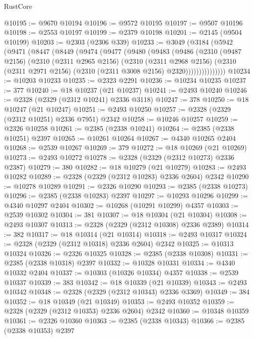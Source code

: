 \begin{lexlean}{RustCore}
\begin{coremodule}
@10195 := @9670 @10194
@10196 := @9572 @10195
@10197 := @9507 @10196
@10198 := @2553 @10197
@10199 := @2379 @10198
@10201 := @2145 (@9504 @10199)
@10203 := @2303 (@2306 @339)
@10233 := @3049
    (@3184
      (@5942
        (@9471
          (@8447
            (@8449
              (@9474
                (@9477
                  (@9480
                    (@9483
                      (@9486
                        (@2310
                          (@9487 @2156)
                          (@2310
                            (@2311 @2965 @2156)
                            (@2310
                              (@2311 @2968 @2156)
                              (@2310
                                (@2311 @2971 @2156)
                                (@2310 (@2311 @3008 @2156) @2320)))))))))))))))
@10234 := @10203 @10233
@10235 := @2323 @2291
@10236 := @10234 @10235
@10237 := 377
@10240 := @18 @10237 (@21 @10237)
@10241 := @2493 @10240
@10246 := @2328 (@2329 (@2312 @10241) @2336 @3118)
@10247 := 378
@10250 := @18 @10247 (@21 @10247)
@10251 := @2493 @10250
@10257 := @2328 (@2329 (@2312 @10251) @2336 @7951) @2342
@10258 := @10246 @10257
@10259 := @2326 @10258
@10261 := @2385 (@2338 @10241)
@10264 := @2385 (@2338 @10251) @2397
@10265 := @10261 @10264
@10267 := @4340 @10265 @2404
@10268 := @2539 @10267
@10269 := 379
@10272 := @18 @10269 (@21 @10269)
@10273 := @2493 @10272
@10278 := @2328 (@2329 (@2312 @10273) @2336 @2387)
@10279 := 380
@10282 := @18 @10279 (@21 @10279)
@10283 := @2493 @10282
@10289 := @2328 (@2329 (@2312 @10283) @2336 @2604) @2342
@10290 := @10278 @10289
@10291 := @2326 @10290
@10293 := @2385 (@2338 @10273)
@10296 := @2385 (@2338 @10283) @2397
@10297 := @10293 @10296
@10299 := @4340 @10297 @2404
@10302 := @10268 (@10291 @10299) @4357
@10303 := @2539 @10302
@10304 := 381
@10307 := @18 @10304 (@21 @10304)
@10308 := @2493 @10307
@10313 := @2328 (@2329 (@2312 @10308) @2336 @2389)
@10314 := 382
@10317 := @18 @10314 (@21 @10314)
@10318 := @2493 @10317
@10324 := @2328 (@2329 (@2312 @10318) @2336 @2604) @2342
@10325 := @10313 @10324
@10326 := @2326 @10325
@10328 := @2385 (@2338 @10308)
@10331 := @2385 (@2338 @10318) @2397
@10332 := @10328 @10331
@10334 := @4340 @10332 @2404
@10337 := @10303 (@10326 @10334) @4357
@10338 := @2539 @10337
@10339 := 383
@10342 := @18 @10339 (@21 @10339)
@10343 := @2493 @10342
@10348 := @2328 (@2329 (@2312 @10343) @2336 @3369)
@10349 := 384
@10352 := @18 @10349 (@21 @10349)
@10353 := @2493 @10352
@10359 := @2328 (@2329 (@2312 @10353) @2336 @2604) @2342
@10360 := @10348 @10359
@10361 := @2326 @10360
@10363 := @2385 (@2338 @10343)
@10366 := @2385 (@2338 @10353) @2397

\end{coremodule}
\end{lexlean}
